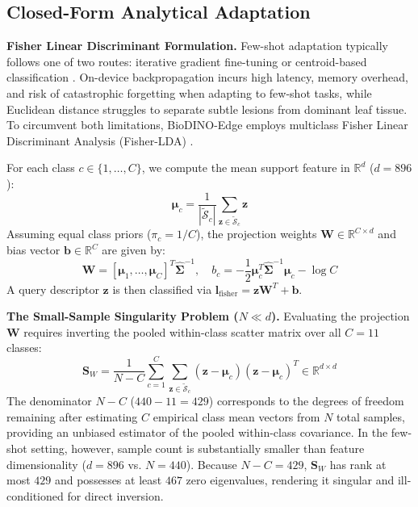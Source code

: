 \documentclass[conference]{IEEEtran}
\begin{document}
\subsection{Closed-Form Analytical Adaptation}
\label{sec:analytical_adaptation}
\textbf{Fisher Linear Discriminant Formulation.} Few-shot adaptation typically follows one of two routes: iterative gradient fine-tuning \cite{finn2017maml} or centroid-based classification \cite{snell2017prototypical}. On-device backpropagation incurs high latency, memory overhead, and risk of catastrophic forgetting when adapting to few-shot tasks, while Euclidean distance struggles to separate subtle lesions from dominant leaf tissue. To circumvent both limitations, BioDINO-Edge employs multiclass Fisher Linear Discriminant Analysis (Fisher-LDA) \cite{fisher1936use, rao1948utilization}.

For each class $c \in \{1, \dots, C\}$, we compute the mean support feature in $\mathbb{R}^d$ ($d = 896$):
\begin{equation}
    \boldsymbol{\mu}_c = \frac{1}{|\tilde{\mathcal{S}}_c|}\sum_{\mathbf{z} \in \tilde{\mathcal{S}}_c} \mathbf{z}
\end{equation}
Assuming equal class priors ($\pi_c = 1/C$), the projection weights $\mathbf{W} \in \mathbb{R}^{C \times d}$ and bias vector $\mathbf{b} \in \mathbb{R}^C$ are given by:
\begin{equation}
    \label{eq:fisher_weights}
    \mathbf{W} = [\boldsymbol{\mu}_1, \dots, \boldsymbol{\mu}_C]^T \hat{\mathbf{\Sigma}}^{-1}, \quad
    b_c = -\frac{1}{2} \boldsymbol{\mu}_c^T \hat{\mathbf{\Sigma}}^{-1} \boldsymbol{\mu}_c - \log C
\end{equation}
A query descriptor $\mathbf{z}$ is then classified via $\mathbf{l}_{\text{fisher}} = \mathbf{z} \mathbf{W}^T + \mathbf{b}$.

\textbf{The Small-Sample Singularity Problem ($N \ll d$).} Evaluating the projection $\mathbf{W}$ requires inverting the pooled within-class scatter matrix over all $C=11$ classes:
\begin{equation}
    \mathbf{S}_W = \frac{1}{N - C}\sum_{c=1}^C \sum_{\mathbf{z} \in \tilde{\mathcal{S}}_c} (\mathbf{z} - \boldsymbol{\mu}_c)(\mathbf{z} - \boldsymbol{\mu}_c)^T \in \mathbb{R}^{d \times d}
\end{equation}
The denominator $N - C$ ($440 - 11 = 429$) corresponds to the degrees of freedom remaining after estimating $C$ empirical class mean vectors from $N$ total samples, providing an unbiased estimator of the pooled within-class covariance. In the few-shot setting, however, sample count is substantially smaller than feature dimensionality ($d = 896$ vs. $N = 440$). Because $N - C = 429$, $\mathbf{S}_W$ has rank at most $429$ and possesses at least $467$ zero eigenvalues, rendering it singular and ill-conditioned for direct inversion.
\end{document}
